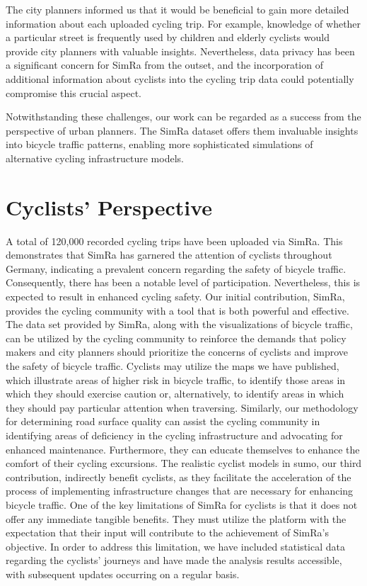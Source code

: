 The city planners informed us that it would be beneficial to gain more detailed information about each uploaded cycling trip.
For example, knowledge of whether a particular street is frequently used by children and elderly cyclists would provide city planners with valuable insights.
Nevertheless, data privacy has been a significant concern for SimRa from the outset, and the incorporation of additional information about cyclists into the cycling trip data could potentially compromise this crucial aspect.

Notwithstanding these challenges, our work can be regarded as a success from the perspective of urban planners. 
The SimRa dataset offers them invaluable insights into bicycle traffic patterns, enabling more sophisticated simulations of alternative cycling infrastructure models. 


\section*{Cyclists' Perspective}
A total of 120,000 recorded cycling trips have been uploaded via SimRa.  
This demonstrates that SimRa has garnered the attention of cyclists throughout Germany, indicating a prevalent concern regarding the safety of bicycle traffic.
Consequently, there has been a notable level of participation.
Nevertheless, this is expected to result in enhanced cycling safety.
Our initial contribution, SimRa, provides the cycling community with a tool that is both powerful and effective.
The data set provided by SimRa, along with the visualizations of bicycle traffic, can be utilized by the cycling community to reinforce the demands that policy makers and city planners should prioritize the concerns of cyclists and improve the safety of bicycle traffic.
Cyclists may utilize the maps we have published, which illustrate areas of higher risk in bicycle traffic, to identify those areas in which they should exercise caution or, alternatively, to identify areas in which they should pay particular attention when traversing.
Similarly, our methodology for determining road surface quality can assist the cycling community in identifying areas of deficiency in the cycling infrastructure and advocating for enhanced maintenance.
Furthermore, they can educate themselves to enhance the comfort of their cycling excursions.
The realistic cyclist models in \ac{sumo}, our third contribution, indirectly benefit cyclists, as they facilitate the acceleration of the process of implementing infrastructure changes that are necessary for enhancing bicycle traffic.
One of the key limitations of SimRa for cyclists is that it does not offer any immediate tangible benefits.
They must utilize the platform with the expectation that their input will contribute to the achievement of SimRa's objective.
In order to address this limitation, we have included statistical data regarding the cyclists' journeys and have made the analysis results accessible, with subsequent updates occurring on a regular basis.

